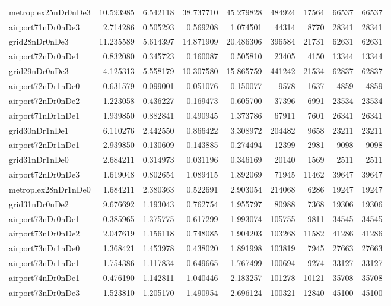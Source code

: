 \begin{longtable}{|l|r|r|r|r|r|r|r|r|}
metroplex25nDr0nDe3 & 10.593985 & 6.542118 & 38.737710 & 45.279828 & 484924 & 17564 & 66537 & 66537 \\
airport71nDr0nDe3 & 2.714286 & 0.505293 & 0.569208 & 1.074501 & 44314 & 8770 & 28341 & 28341 \\
grid28nDr0nDe3 & 11.235589 & 5.614397 & 14.871909 & 20.486306 & 396584 & 21731 & 62631 & 62631 \\
airport72nDr0nDe1 & 0.832080 & 0.345723 & 0.160087 & 0.505810 & 23405 & 4150 & 13344 & 13344 \\
grid29nDr0nDe3 & 4.125313 & 5.558179 & 10.307580 & 15.865759 & 441242 & 21534 & 62837 & 62837 \\
airport72nDr1nDe0 & 0.631579 & 0.099001 & 0.051076 & 0.150077 & 9578 & 1637 & 4859 & 4859 \\
airport72nDr0nDe2 & 1.223058 & 0.436227 & 0.169473 & 0.605700 & 37396 & 6991 & 23534 & 23534 \\
airport71nDr1nDe1 & 1.939850 & 0.882841 & 0.490945 & 1.373786 & 67911 & 7601 & 26341 & 26341 \\
grid30nDr1nDe1 & 6.110276 & 2.442550 & 0.866422 & 3.308972 & 204482 & 9658 & 23211 & 23211 \\
airport72nDr1nDe1 & 2.939850 & 0.130609 & 0.143885 & 0.274494 & 12399 & 2981 & 9098 & 9098 \\
grid31nDr1nDe0 & 2.684211 & 0.314973 & 0.031196 & 0.346169 & 20140 & 1569 & 2511 & 2511 \\
airport72nDr0nDe3 & 1.619048 & 0.802654 & 1.089415 & 1.892069 & 71945 & 11462 & 39647 & 39647 \\
metroplex28nDr1nDe0 & 1.684211 & 2.380363 & 0.522691 & 2.903054 & 214068 & 6286 & 19247 & 19247 \\
grid31nDr0nDe2 & 9.676692 & 1.193043 & 0.762754 & 1.955797 & 80988 & 7368 & 19306 & 19306 \\
airport73nDr0nDe1 & 0.385965 & 1.375775 & 0.617299 & 1.993074 & 105755 & 9811 & 34545 & 34545 \\
airport73nDr0nDe2 & 2.047619 & 1.156118 & 0.748085 & 1.904203 & 103268 & 11582 & 41286 & 41286 \\
airport73nDr1nDe0 & 1.368421 & 1.453978 & 0.438020 & 1.891998 & 103819 & 7945 & 27663 & 27663 \\
airport73nDr1nDe1 & 1.754386 & 1.117834 & 0.649665 & 1.767499 & 100694 & 9274 & 33127 & 33127 \\
airport74nDr0nDe1 & 0.476190 & 1.142811 & 1.040446 & 2.183257 & 101278 & 10121 & 35708 & 35708 \\
airport73nDr0nDe3 & 1.523810 & 1.205170 & 1.490954 & 2.696124 & 100321 & 12840 & 45100 & 45100 \\

\end{longtable}

